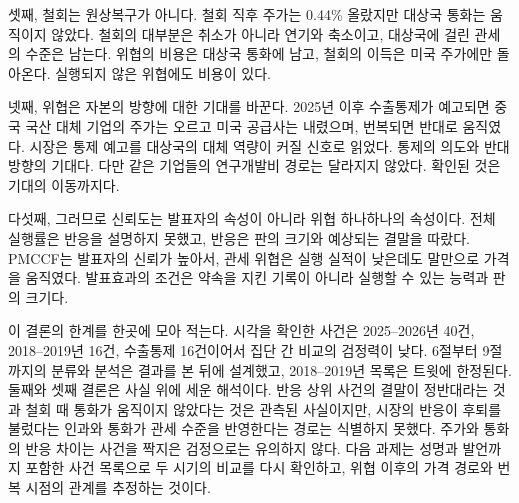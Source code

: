 \documentclass[11pt,a4paper]{article}
\begin{document}
셋째, 철회는 원상복구가 아니다. 철회 직후 주가는 0.44\% 올랐지만 대상국 통화는 움직이지 않았다. 철회의 대부분은 취소가 아니라 연기와 축소이고, 대상국에 걸린 관세의 수준은 남는다. 위협의 비용은 대상국 통화에 남고, 철회의 이득은 미국 주가에만 돌아온다. 실행되지 않은 위협에도 비용이 있다.

넷째, 위협은 자본의 방향에 대한 기대를 바꾼다. 2025년 이후 수출통제가 예고되면 중국 국산 대체 기업의 주가는 오르고 미국 공급사는 내렸으며, 번복되면 반대로 움직였다. 시장은 통제 예고를 대상국의 대체 역량이 커질 신호로 읽었다. 통제의 의도와 반대 방향의 기대다. 다만 같은 기업들의 연구개발비 경로는 달라지지 않았다. 확인된 것은 기대의 이동까지다.

다섯째, 그러므로 신뢰도는 발표자의 속성이 아니라 위협 하나하나의 속성이다. 전체 실행률은 반응을 설명하지 못했고, 반응은 판의 크기와 예상되는 결말을 따랐다. PMCCF는 발표자의 신뢰가 높아서, 관세 위협은 실행 실적이 낮은데도 말만으로 가격을 움직였다. 발표효과의 조건은 약속을 지킨 기록이 아니라 실행할 수 있는 능력과 판의 크기다.

이 결론의 한계를 한곳에 모아 적는다. 시각을 확인한 사건은 2025--2026년 40건, 2018--2019년 16건, 수출통제 16건이어서 집단 간 비교의 검정력이 낮다. 6절부터 9절까지의 분류와 분석은 결과를 본 뒤에 설계했고, 2018--2019년 목록은 트윗에 한정된다. 둘째와 셋째 결론은 사실 위에 세운 해석이다. 반응 상위 사건의 결말이 정반대라는 것과 철회 때 통화가 움직이지 않았다는 것은 관측된 사실이지만, 시장의 반응이 후퇴를 불렀다는 인과와 통화가 관세 수준을 반영한다는 경로는 식별하지 못했다. 주가와 통화의 반응 차이는 사건을 짝지은 검정으로는 유의하지 않다. 다음 과제는 성명과 발언까지 포함한 사건 목록으로 두 시기의 비교를 다시 확인하고, 위협 이후의 가격 경로와 번복 시점의 관계를 추정하는 것이다.
\end{document}
